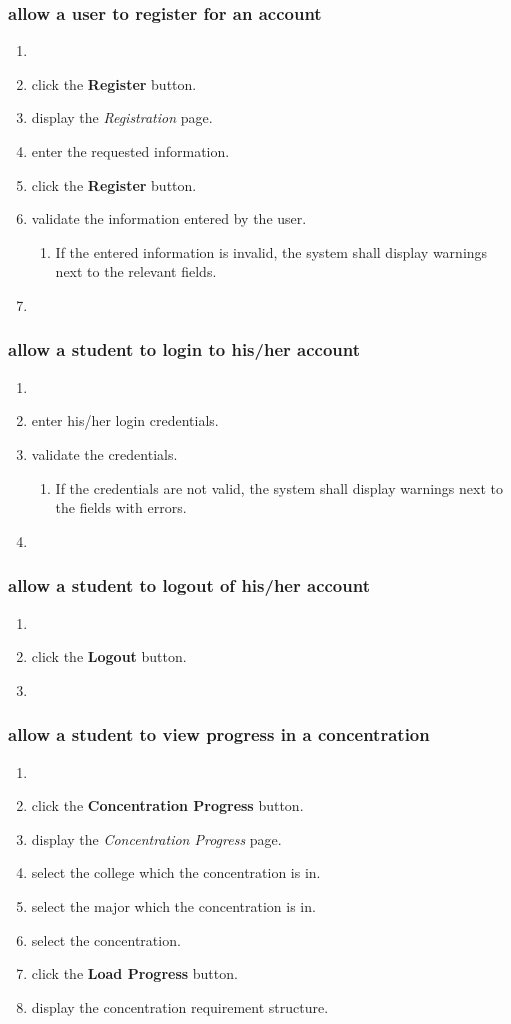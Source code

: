 \documentclass[12pt]{article}
\newenvironment{requirement}[1]
{
    \renewcommand{\thesubsubsection}{R\arabic{subsubsection}.}
    \renewcommand{\labelenumi}{
        \arabic{subsubsection}.\arabic{enumi}
    }
    \renewcommand{\labelenumii}{
        \arabic{subsubsection}.\arabic{enumi}.\arabic{enumii}
    }
    \renewcommand{\labelenumiii}{
        \arabic{subsubsection}.\arabic{enumi}.\arabic{enumii}.\arabic{enumiii}
    }
    \renewcommand{\labelenumiv}{
        \arabic{subsubsection}.\arabic{enumi}.\arabic{enumii}.\arabic{enumiii}.\arabic{enumiv}
    }
    \subsubsection{#1}
    \begin{enumerate}
}
{
    \end{enumerate}
}
\begin{document}
\begin{requirement}{\sysshall allow a user to register for an account}
    \item \loginpage
    \item \usershall click the \textbf{Register} button.
    \item \sysshall display the \emph{Registration} page.
    \item \usershall enter the requested information.
    \item \usershall click the \textbf{Register} button.
    \item \sysshall validate the information entered by the user.
    \begin{enumerate}
        \item If the entered information is invalid, the system shall display warnings next to the
        relevant fields.
    \end{enumerate}
    \item \redirecthome
\end{requirement}

\begin{requirement}{\sysshall allow a student to login to his/her account}
    \item \loginpage
    \item \stushall enter his/her login credentials.
    \item \sysshall validate the credentials.
    \begin{enumerate}
        \item If the credentials are not valid, the system shall display warnings next to the
        fields with errors.
    \end{enumerate}
    \item \redirecthome
\end{requirement}

\begin{requirement}{\sysshall allow a student to logout of his/her account}
    \item \mainmenu
    \item \stushall click the \textbf{Logout} button.
    \item \loginpage
\end{requirement}

\begin{requirement}{\sysshall allow a student to view progress in a concentration}
    \item \mainmenu
    \item \stushall click the \textbf{Concentration Progress} button.
    \item \sysshall display the \emph{Concentration Progress} page.
    \item \stushall select the college which the concentration is in.
    \item \stushall select the major which the concentration is in.
    \item \stushall select the concentration.
    \item \stushall click the \textbf{Load Progress} button.
    \item \sysshall display the concentration requirement structure.
    \gotohome
\end{requirement}
\end{document}
